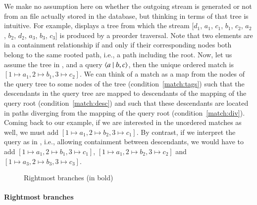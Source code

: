 We make no assumption here on whether the outgoing stream is generated
or not from an \XML file actually stored in the database, but thinking
in terms of that tree is intuitive. For example, 
displays a tree from which the stream [\(d_1\), \(a_1\), \(c_1\),
  \(b_1\), \(c_2\), \(a_2\), \(b_2\), \(d_2\), \(a_3\), \(b_3\),
  \(c_3\)] is produced by a preorder traversal. Note that two elements
are in a containment relationship if and only if their corresponding
nodes both belong to the same rooted path, i.e., a path including the
root. Now, let us assume the tree in , and a query
\(\langle a \mid b,c\rangle\), then the unique ordered match is \([1 \mapsto a_1,
  2 \mapsto b_1, 3 \mapsto c_2]\).
We can think of a match as a map from the nodes of the query
 tree to some nodes of the \XML tree (condition~\eqref{match:tags})
 such that the descendants in the query tree are mapped to descendants
 of the mapping of the query root (condition~\eqref{match:desc}) and
 such that these descendants are located in paths diverging from the
 mapping of the query root (condition~\eqref{match:div}). Coming back
 to our example, if we are interested in the unordered matches as
 well, we must add \([1 \mapsto a_1, 2 \mapsto b_2, 3 \mapsto
 c_1]\). By contrast, if we interpret the query as in \XPath, i.e.,
 allowing containment between descendants, we would have to add \([1
 \mapsto a_1, 2 \mapsto b_1, 3 \mapsto c_1]\), \([1 \mapsto a_1, 2
 \mapsto b_2, 3 \mapsto c_2]\) and \([1 \mapsto a_3, 2 \mapsto b_3, 3
 \mapsto c_3]\).

\begin{wrapfigure}[10]{r}{0pt}
\vspace{-\baselineskip}
\centering
{}
\quad
{}
\quad
{}
\caption{Rightmost branches (in bold)\label{fig:rightmost_branches}}
\end{wrapfigure}

\paragraph{Rightmost branches}


